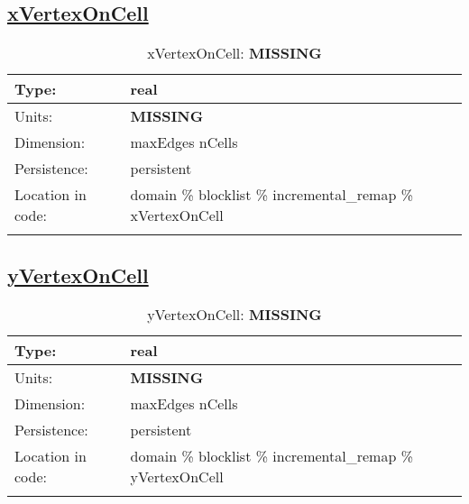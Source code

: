 \subsection[xVertexOnCell]{\hyperref[sec:var_tab_incremental_remap]{xVertexOnCell}}
\label{subsec:var_sec_incremental_remap_xVertexOnCell}
\begin{center}
\begin{longtable}{| p{2.0in} | p{4.0in} |}
        \hline 
        Type: & real \\
        \hline 
        Units: & {\bf \color{red} MISSING} \\
        \hline 
        Dimension: & maxEdges nCells \\
        \hline 
        Persistence: & persistent \\
        \hline 
         Location in code: & domain \% blocklist \% incremental\_remap \% xVertexOnCell \\
         \hline 
    \caption{xVertexOnCell: {\bf \color{red} MISSING}}
\end{longtable}
\end{center}
\subsection[yVertexOnCell]{\hyperref[sec:var_tab_incremental_remap]{yVertexOnCell}}
\label{subsec:var_sec_incremental_remap_yVertexOnCell}
\begin{center}
\begin{longtable}{| p{2.0in} | p{4.0in} |}
        \hline 
        Type: & real \\
        \hline 
        Units: & {\bf \color{red} MISSING} \\
        \hline 
        Dimension: & maxEdges nCells \\
        \hline 
        Persistence: & persistent \\
        \hline 
         Location in code: & domain \% blocklist \% incremental\_remap \% yVertexOnCell \\
         \hline 
    \caption{yVertexOnCell: {\bf \color{red} MISSING}}
\end{longtable}
\end{center}
